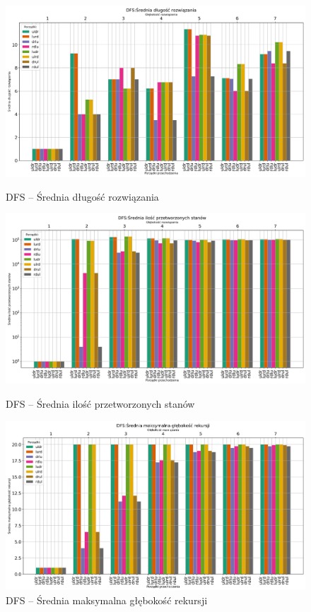 \documentclass{classrep}
\begin{document}
\begin{figure}[H]
    \includegraphics[width=\textwidth]{charts/DFS_path_length.png}
    \caption{DFS -- Średnia długość rozwiązania}
    \label{DFS:path_length}
    \vspace{0.2cm}
    \includegraphics[width=\textwidth]{charts/DFS_processed.png}
    \caption{DFS -- Średnia ilość przetworzonych stanów}
    \label{DFS:processed}
    \vspace{0.2cm}
    \includegraphics[width=\textwidth]{charts/DFS_recursed.png}
    \caption{DFS --  Średnia maksymalna głębokość rekursji}
    \label{DFS:time}

\end{figure}
\end{document}

